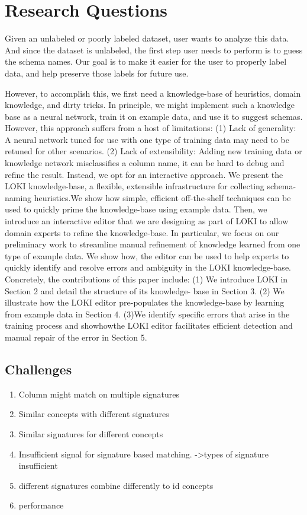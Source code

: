 \documentclass{vldb}
\begin{document}
\section{Research Questions}
Given an unlabeled or poorly labeled dataset, user wants to analyze this data. And since the dataset is unlabeled, the first step user needs to perform is to guess the schema names. Our goal is to make it easier for the user to properly label data, and help preserve those labels for future use. 

However, to accomplish this, we first need a knowledge-base of heuristics, domain knowledge, and dirty tricks. In principle, we might implement such a knowledge base as a neural network, train it on example data, and use it to suggest schemas. However, this approach suffers from a host of limitations:
(1) Lack of generality: A neural network tuned for use with one
type of training data may need to be retuned for other scenarios.
(2) Lack of extensibility: Adding new training data or knowledge network misclassifies a column name, it can be hard to debug and
refine the result. Instead, we opt for an interactive approach. We
present the LOKI knowledge-base, a flexible, extensible infrastructure
for collecting schema-naming heuristics.We show how simple,
efficient off-the-shelf techniques can be used to quickly prime the
knowledge-base using example data. Then, we introduce an interactive
editor that we are designing as part of LOKI to allow domain
experts to refine the knowledge-base. In particular, we focus on our
preliminary work to streamline manual refinement of knowledge
learned from one type of example data. We show how, the editor
can be used to help experts to quickly identify and resolve errors
and ambiguity in the LOKI knowledge-base.
Concretely, the contributions of this paper include: (1) We introduce
LOKI in Section 2 and detail the structure of its knowledge-
base in Section 3. (2) We illustrate how the LOKI editor
pre-populates the knowledge-base by learning from example data
in Section 4. (3)We identify specific errors that arise in the training
process and showhowthe LOKI editor facilitates efficient detection
and manual repair of the error in Section 5.

\subsection{Challenges}
\begin{enumerate}
	\item Column might match on multiple signatures
	\item Similar concepts with different signatures
	\item Similar signatures for different concepts
	\item Insufficient signal for signature based matching.
	->types of signature insufficient
	\item different signatures combine differently to id concepts
	\item performance
\end{enumerate}
\end{document}
